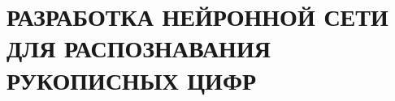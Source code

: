 \chapter[Разработка нейронной сети для распознавания рукописных цифр]
{РАЗРАБОТКА НЕЙРОННОЙ СЕТИ ДЛЯ РАСПОЗНАВАНИЯ РУКОПИСНЫХ ЦИФР}

